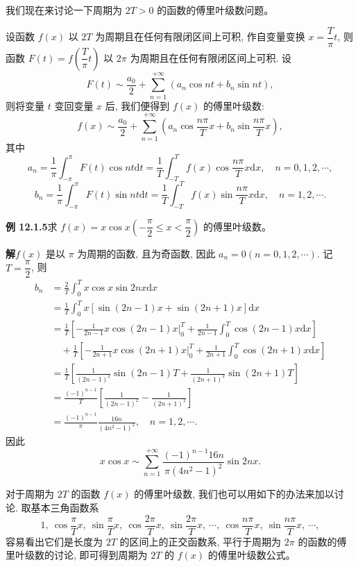 \documentclass[UTF8,12pt,a4paper,fontset=fandol]{ctexart}
\begin{document}
我们现在来讨论一下周期为 $2T>0$ 的函数的傅里叶级数问题。

设函数 $f(x)$ 以 $2T$ 为周期且在任何有限闭区间上可积, 作自变量变换 $x=\dfrac{T}{\pi}t$, 则函数 $F(t)=f\left(\dfrac{T}{\pi}t\right)$ 以 $2\pi$ 为周期且在任何有限闭区间上可积. 设
\[
  F(t)\sim\frac{a_0}{2}+\sum_{n=1}^{+\infty}(a_n\cos nt+b_n\sin nt),
\]
则将变量 $t$ 变回变量 $x$ 后, 我们便得到 $f(x)$ 的傅里叶级数:
\[
  f(x)\sim\frac{a_0}{2}
  +\sum_{n=1}^{+\infty}\left(a_n\cos\frac{n\pi}{T}x+b_n\sin\frac{n\pi}{T}x\right),
\]
其中
\[
  a_n=\frac1\pi\int_{-\pi}^{\pi}F(t)\cos nt\mathrm dt
  =\frac1T\int_{-T}^{T}f(x)\cos\frac{n\pi}{T}x\mathrm dx,\quad n=0,1,2,\cdots,
\]
\[
  b_n=\frac1\pi\int_{-\pi}^{\pi}F(t)\sin nt\mathrm dt
  =\frac1T\int_{-T}^{T}f(x)\sin\frac{n\pi}{T}x\mathrm dx,\quad n=1,2,\cdots.
\]

\noindent\textbf{例 12.1.5}\quad 求 $f(x)=x\cos x\left(-\dfrac{\pi}{2}\leqslant x<\dfrac{\pi}{2}\right)$ 的傅里叶级数。

\noindent\textbf{解}\quad $f(x)$ 是以 $\pi$ 为周期的函数, 且为奇函数, 因此 $a_n=0(n=0,1,2,\cdots)$. 记 $T=\dfrac{\pi}{2}$, 则
\[
\begin{aligned}
  b_n
  &=\frac2T\int_0^T x\cos x\sin 2nx\mathrm dx\\
  &=\frac1T\int_0^T x[\sin(2n-1)x+\sin(2n+1)x]\mathrm dx\\
  &=\frac1T\left[-\frac1{2n-1}x\cos(2n-1)x\bigg|_0^T
    +\frac1{2n-1}\int_0^T\cos(2n-1)x\mathrm dx\right]\\
  &\quad+\frac1T\left[-\frac1{2n+1}x\cos(2n+1)x\bigg|_0^T
    +\frac1{2n+1}\int_0^T\cos(2n+1)x\mathrm dx\right]\\
  &=\frac1T\left[\frac1{(2n-1)^2}\sin(2n-1)T
    +\frac1{(2n+1)^2}\sin(2n+1)T\right]\\
  &=\frac{(-1)^{n-1}}{T}\left[\frac1{(2n-1)^2}-\frac1{(2n+1)^2}\right]\\
  &=\frac{(-1)^{n-1}}{\pi}\frac{16n}{(4n^2-1)^2},\quad n=1,2,\cdots.
\end{aligned}
\]
因此
\[
  x\cos x\sim
  \sum_{n=1}^{+\infty}\frac{(-1)^{n-1}16n}{\pi(4n^2-1)^2}\sin 2nx.
\]

对于周期为 $2T$ 的函数 $f(x)$ 的傅里叶级数, 我们也可以用如下的办法来加以讨论. 取基本三角函数系
\[
  1,\ \cos\frac{\pi}{T}x,\ \sin\frac{\pi}{T}x,\ \cos\frac{2\pi}{T}x,\ \sin\frac{2\pi}{T}x,\ \cdots,\ 
  \cos\frac{n\pi}{T}x,\ \sin\frac{n\pi}{T}x,\ \cdots,
\]
容易看出它们是长度为 $2T$ 的区间上的正交函数系, 平行于周期为 $2\pi$ 的函数的傅里叶级数的讨论, 即可得到周期为 $2T$ 的 $f(x)$ 的傅里叶级数公式。
\end{document}
